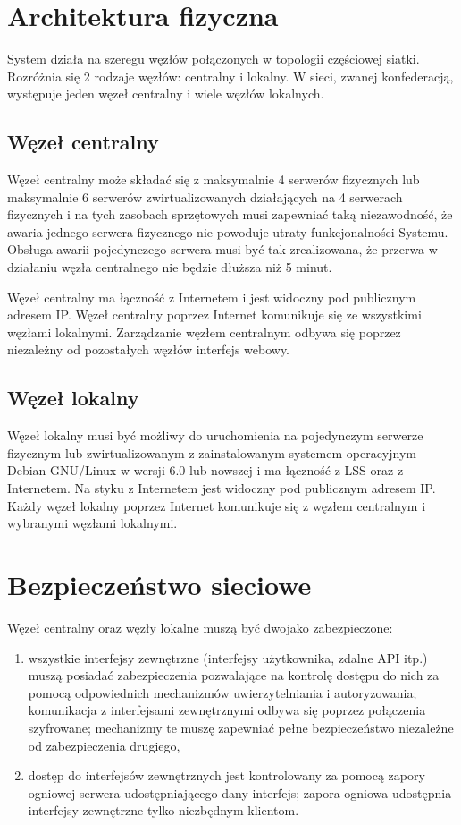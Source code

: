\documentclass[a4paper]{report}
\begin{document}
\section{Architektura fizyczna}
\label{sec:arch_fiz}

System działa na szeregu węzłów połączonych w topologii częściowej siatki. Rozróżnia się 2 rodzaje węzłów: centralny i lokalny. W sieci, zwanej konfederacją, występuje jeden węzeł centralny i wiele węzłów lokalnych. 

\subsection{Węzeł centralny}
Węzeł centralny może składać się z maksymalnie 4 serwerów fizycznych lub maksymalnie 6 serwerów zwirtualizowanych działających na 4 serwerach fizycznych i na tych zasobach sprzętowych musi zapewniać taką niezawodność, że awaria jednego serwera fizycznego nie powoduje utraty funkcjonalności Systemu. Obsługa awarii pojedynczego serwera musi być tak zrealizowana, że przerwa w działaniu węzła centralnego nie będzie dłuższa niż 5 minut.

Węzeł centralny ma łączność z Internetem i jest widoczny pod publicznym adresem IP. Węzeł centralny poprzez Internet komunikuje się ze wszystkimi węzłami lokalnymi. Zarządzanie węzłem centralnym odbywa się poprzez niezależny od pozostałych węzłów interfejs webowy.

\subsection{Węzeł lokalny}
Węzeł lokalny musi być możliwy do uruchomienia na pojedynczym serwerze fizycznym lub zwirtualizowanym z zainstalowanym systemem operacyjnym Debian GNU/Linux w wersji 6.0 lub nowszej i ma łączność z LSS oraz z Internetem. Na styku z Internetem jest widoczny pod publicznym adresem IP. Każdy węzeł lokalny poprzez Internet komunikuje się z węzłem centralnym i wybranymi węzłami lokalnymi.  

\section{Bezpieczeństwo sieciowe}
Węzeł centralny oraz węzły lokalne muszą być dwojako zabezpieczone:
\begin{enumerate}
\item wszystkie interfejsy zewnętrzne (interfejsy użytkownika, zdalne API itp.) muszą posiadać zabezpieczenia
pozwalające na kontrolę dostępu do nich za pomocą odpowiednich mechanizmów uwierzytelniania i autoryzowania;
komunikacja z interfejsami zewnętrznymi odbywa się poprzez połączenia szyfrowane; mechanizmy te muszę zapewniać pełne bezpieczeństwo niezależne od zabezpieczenia drugiego,
\item dostęp do interfejsów zewnętrznych jest kontrolowany za pomocą zapory ogniowej serwera udostępniającego
dany interfejs; zapora ogniowa udostępnia interfejsy zewnętrzne tylko niezbędnym klientom.
\end{enumerate}
\end{document}
